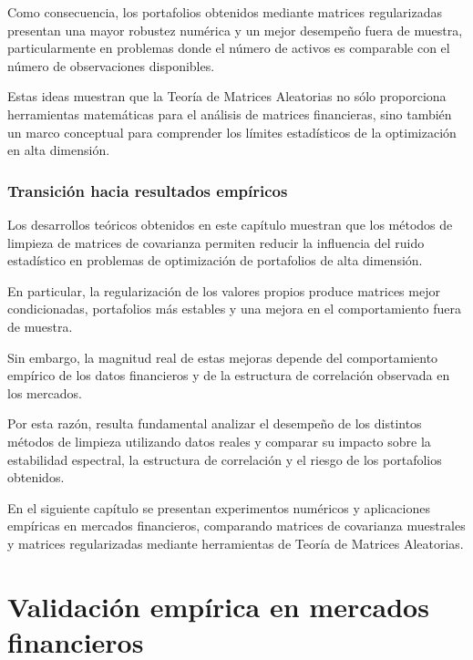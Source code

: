 \documentclass[letterpaper,12pt,oneside]{book}
\begin{document}
Como consecuencia, los portafolios obtenidos mediante matrices regularizadas presentan una mayor robustez numérica y un mejor desempeño fuera de muestra, particularmente en problemas donde el número de activos es comparable con el número de observaciones disponibles.

Estas ideas muestran que la Teoría de Matrices Aleatorias no sólo proporciona herramientas matemáticas para el análisis de matrices financieras, sino también un marco conceptual para comprender los límites estadísticos de la optimización en alta dimensión.

\subsection{Transición hacia resultados empíricos}

Los desarrollos teóricos obtenidos en este capítulo muestran que los métodos de limpieza de matrices de covarianza permiten reducir la influencia del ruido estadístico en problemas de optimización de portafolios de alta dimensión.

En particular, la regularización de los valores propios produce matrices mejor condicionadas, portafolios más estables y una mejora en el comportamiento fuera de muestra.

Sin embargo, la magnitud real de estas mejoras depende del comportamiento empírico de los datos financieros y de la estructura de correlación observada en los mercados.

Por esta razón, resulta fundamental analizar el desempeño de los distintos métodos de limpieza utilizando datos reales y comparar su impacto sobre la estabilidad espectral, la estructura de correlación y el riesgo de los portafolios obtenidos.

En el siguiente capítulo se presentan experimentos numéricos y aplicaciones empíricas en mercados financieros, comparando matrices de covarianza muestrales y matrices regularizadas mediante herramientas de Teoría de Matrices Aleatorias.

\chapter{Validación empírica en mercados financieros}
\end{document}
